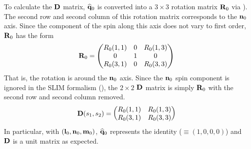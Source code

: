 To calculate the ${\bf D}$ matrix, $\widehat{{\bf q}}_0$ is converted into a $3 \times 3$ rotation matrix
${\bf R}_0$ via ). The second row and second column of this rotation matrix corresponds to the
${\bf n}_0$ axis. Since the component of the spin along this axis does not vary to first order,
${\bf R}_0$ has the form
\begin{equation}
  {\bf R}_0 = \begin{pmatrix}
      R_0(1,1) & 0 & R_0(1,3) \\
      0        & 1 & 0        \\
      R_0(3,1) & 0 & R_0(3,3)
  \end{pmatrix}
\end{equation}
That is, the rotation is around the ${\bf n}_0$ axis. Since the ${\bf n}_0$ spin component is ignored in
the SLIM formalism (), the $2 \times 2$ ${\bf D}$ matrix is simply ${\bf R}_0$ with the second
row and second column removed.
\begin{equation}
  {\bf D}(s_1, s_2) = \begin{pmatrix}
      R_0(1,1) & R_0(1,3) \\
      R_0(3,1) & R_0(3,3)
  \end{pmatrix}
\end{equation}
In particular, with $({\bf l}_0, {\bf n}_0, {\bf m}_0)$, $\widehat {{\bf q}}_0$ represents the identity ($\equiv
(1, 0, 0, 0)$) and ${\bf D}$ is a unit matrix as expected.

